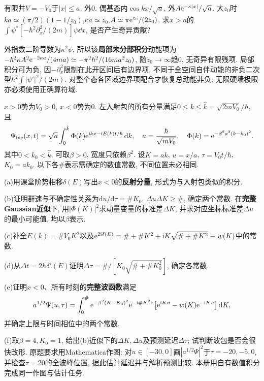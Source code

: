 \begin{exercise}
有限井$V=-V_0$于$|x|\le a$, 外0. 偶基态内$\cos kx/\sqrt a$, 外$A\mathrm e^{-\kappa|x|}/\sqrt a$. 大$z_0$时$ka\simeq(\pi/2)(1-1/z_0)$,$\kappa a\simeq z_0$,$A\simeq\pi\mathrm e^{z_0}/(2z_0)$. 求$x>a$的$\int\psi^*[-\hbar^2\partial_x^2/(2m)]\psi\dd x$, 是否产生奇异贡献?
\end{exercise}
\begin{solution}
外指数二阶导数为$\kappa^2\psi$, 所以该\textbf{局部未分部积分}动能项为$-\hbar^2\kappa A^2\mathrm e^{-2\kappa a}/(4ma)\simeq-\pi^2\hbar^2/(16ma^2z_0)$, 随$z_0\to\infty$趋0, 无奇异有限残项. 局部积分可为负, 因$-\partial_x^2$限制在此开区间后有边界项, 不同于全空间自伴动能的非负二次型$\hbar^2\int|\psi'|^2/(2m)$. 对整个态各区域边界项配合才恢复总动能非负; 无限硬墙极限亦必须使用正确算符域.
\end{solution}
\begin{exercise}
$x>0$势为$V_0>0$, $x<0$势为0. 左入射包的所有分量满足$0\le k\le\hat k=\sqrt{2mV_0}/\hbar$, 且
\[
\Psi_{\rm inc}(x,t)=\sqrt a\int_0^{\hat k}\Phi(k)\mathrm e^{\mathrm i kx-\mathrm i E(k)t/\hbar}\,\mathrm d k,\quad
a=\frac{\hbar}{\sqrt{mV_0}},\quad
\Phi(k)=\mathrm e^{-\beta^2a^2(k-k_0)^2}.
\]
其中$0<k_0<\hat k$, 可取$\beta>0$, 宽度只依赖$\beta^2$. 设$K=ak$, $u=x/a$, $\tau=V_0t/\hbar$, $K_0=ak_0$. 以下各$\#$表示需确定的数值常数, 不同位置未必相同.

(a)用课堂阶势相移$\delta(E)$写出$x<0$的\textbf{反射分量}, 形式为与入射包类似的积分.

(b)证明群速与不确定性关系为$\mathrm du/\mathrm d\tau=\#K_0$, $\Delta u\Delta K\ge\#$, 确定两个常数. 在\textbf{完整Gaussian近似}下, 用$|\Phi(K)|^2$求动量变量的标准差$\Delta K$, 并求对应坐标标准差$\Delta u$的最小可能值, 均以$\beta$表示.

(c)补全$E(k)=\#V_0K^2$以及$\mathrm e^{2\mathrm i\delta(E)}=\#+\#K^2+\mathrm i K\sqrt{\#+\#K^2}\equiv w(K)$中的常数.

(d)从$\Delta t=2\hbar\delta'(E)$证明$\Delta\tau=\#/[K_0\sqrt{\#+\#K_0^2}]$, 确定各常数.

(e)证明$x<0$、所有时刻的\textbf{完整波函数}满足
\[
a^{1/2}\Psi(u,\tau)=\int_0^{\#}\mathrm e^{-\beta^2(K-K_0)^2}\mathrm e^{-\mathrm i\#K^2\tau}
\bigl[\mathrm e^{\mathrm i Ku}-w(K)\mathrm e^{-\mathrm i Ku}\bigr]\,\mathrm d K,
\]
并确定上限与时间相位中的两个常数.

(f)取$\beta=4,K_0=1$, 给出(b)近似下的$\Delta K,\Delta u$及预测延迟$\Delta\tau$; 试判断波包是否会很快改形. 原题要求用Mathematica作图: 对$u\in[-30,0]$画$|a^{1/2}\Psi|^2$于$\tau=-20,-5,0$, 并检查$\tau=20$的全波峰位置, 据此估计延迟并与解析预测比较. 本册用自有数值积分完成同一作图与估计任务.
\end{exercise}
